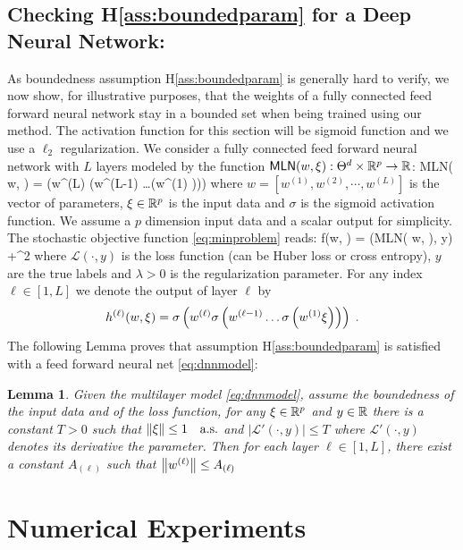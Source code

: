 \documentclass[11pt]{article}
\newtheorem{Lemma}{Lemma}
\theoremstyle{k}
\begin{document}
\subsection{Checking H\ref{ass:boundedparam} for a Deep Neural Network:}
As boundedness assumption H\ref{ass:boundedparam} is generally hard to verify, we now show, for illustrative purposes, that the weights of a fully connected feed forward neural network stay in a bounded set when being trained using our method. 
The activation function for this section will be sigmoid function and we use a $\ell_2$ regularization. 
We consider a fully connected feed forward neural network with $L$ layers modeled by the function $\textsf{MLN}(w, \xi): \Theta^d \times \mathbb{R}^p \to \mathbb{R}$:
\beq\label{eq:dnnmodel}
\textsf{MLN}( w, \xi) = \sigma\left(w^{(L)} \sigma\left(w^{(L-1)} \ldots \sigma\left(w^{(1)} \xi \right)\right)\right)
\eeq
where $w = [w^{(1)}, w^{(2)}, \cdots , w^{(L)}]$ is the vector of parameters, $\xi \in \mathbb{R}^p$ is the input data and $\sigma$ is the sigmoid activation function. We assume a $p$ dimension input data and a scalar output for simplicity.
The stochastic objective function \eqref{eq:minproblem} reads:
\beq\label{eq:lossmln}
f(w, \xi) = (\textsf{MLN}( w, \xi), y) +^2
\eeq
where $\mathcal{L}(\cdot, y)$ is the loss function (can be Huber loss or cross entropy), $y$ are the true labels and $\lambda >0$ is the regularization parameter.
For any index $\ell \in [1, L]$ we denote the output of layer $\ell$ by 
$$
h^{(\ell)}(w,\xi)= \sigma\left(w^{(\ell)} \sigma\left(w^{(\ell-1)} \ldots \sigma\left(w^{(1)} \xi \right)\right)\right) \;.
$$
The following Lemma proves that assumption H\ref{ass:boundedparam} is satisfied with a feed forward neural net \eqref{eq:dnnmodel}:
\begin{Lemma}\label{lem:dnnh2} 
Given the multilayer model \eqref{eq:dnnmodel}, assume the boundedness of the input data and of the loss function, \ie for any $\xi \in \mathbb{R}^p$ and $y \in \mathbb{R}$ there is a constant $T >0$ such that $\left\Vert \xi \right\Vert \leq 1 \quad \textrm{a.s.}$ and $|\mathcal{L}'(\cdot, y)| \leq T$ where $\mathcal{L}'(\cdot, y)$ denotes its derivative \wrt the parameter. Then for each layer $\ell \in [1,L]$, there exist a constant $A_{(\ell)}$ such that $\left\Vert w^{(\ell)} \right\Vert \leq A_{(\ell)}$
\end{Lemma}
\section{Numerical Experiments}\label{sec:numerical}
\end{document}
